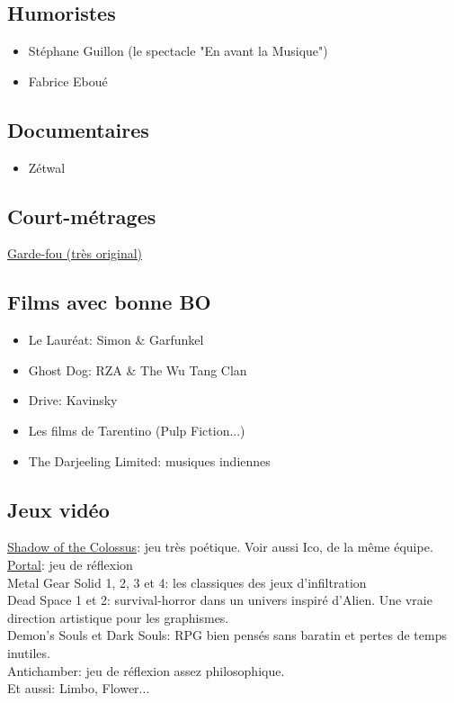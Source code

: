 


\subsection{Humoristes}
\begin{itemize}
\item Stéphane Guillon (le spectacle "En avant la Musique")
\item Fabrice Eboué
\end{itemize}

\subsection{Documentaires}
\begin{itemize}
\item Zétwal
\end{itemize}

\subsection{Court-métrages}
\href{http://www.dailymotion.com/video/xchpac_garde-fou_shortfilms}{Garde-fou (très original)}

\subsection{Films avec bonne BO}
\begin{itemize}
\item Le Lauréat: Simon \& Garfunkel
\item Ghost Dog: RZA \& The Wu Tang Clan
\item Drive: Kavinsky
\item Les films de Tarentino (Pulp Fiction...)
\item The Darjeeling Limited: musiques indiennes
\end{itemize}

\subsection{Jeux vidéo}
\href{http://www.jeuxvideo.com/jeux/playstation-3-ps3/00037095-classics-hd-ico-shadow-of-the-colossus.htm}{Shadow of the Colossus}: jeu très poétique. Voir aussi Ico, de la même équipe.\\
\href{http://www.jeuxvideo.com/jeux/playstation-3-ps3/00020227-portal.htm}{Portal}: jeu de réflexion\\
Metal Gear Solid 1, 2, 3 et 4: les classiques des jeux d'infiltration\\
Dead Space 1 et 2: survival-horror dans un univers inspiré d'Alien. Une vraie direction artistique pour les graphismes.\\
Demon's Souls et Dark Souls: RPG bien pensés sans baratin et pertes de temps inutiles.\\
Antichamber: jeu de réflexion assez philosophique.\\
Et aussi: Limbo, Flower...\\

